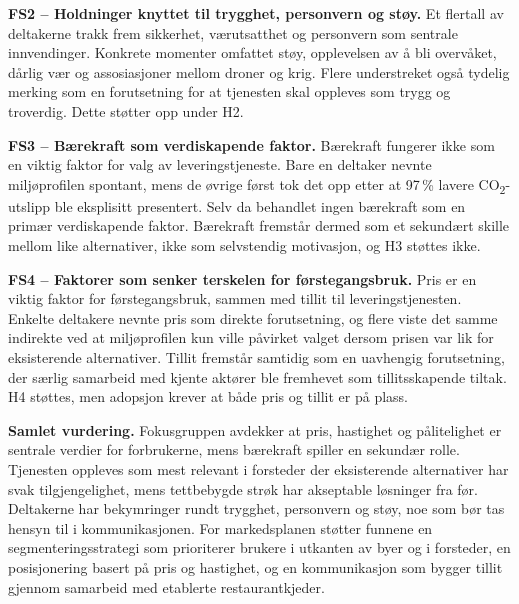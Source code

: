 \textbf{FS2 -- Holdninger knyttet til trygghet, personvern og støy.}
Et flertall av deltakerne trakk frem sikkerhet, værutsatthet og personvern
som sentrale innvendinger. Konkrete momenter omfattet støy, opplevelsen av å
bli overvåket, dårlig vær og assosiasjoner mellom droner og krig. Flere understreket også tydelig merking
som en forutsetning for at tjenesten skal oppleves som trygg og troverdig.
Dette støtter opp under H2.

\textbf{FS3 -- Bærekraft som verdiskapende faktor.}
Bærekraft fungerer ikke som en viktig faktor for valg av leveringstjeneste.
Bare en deltaker nevnte miljøprofilen spontant, mens de øvrige først tok
det opp etter at 97\,\% lavere CO\textsubscript{2}-utslipp ble eksplisitt
presentert. Selv da behandlet ingen bærekraft som en primær verdiskapende faktor. Bærekraft fremstår
dermed som et sekundært skille mellom like alternativer, ikke som
selvstendig motivasjon, og H3 støttes ikke.

\textbf{FS4 -- Faktorer som senker terskelen for førstegangsbruk.}
Pris er en viktig faktor for førstegangsbruk, sammen med tillit til leveringstjenesten.
Enkelte deltakere nevnte pris som direkte
forutsetning, og flere viste det samme indirekte ved at miljøprofilen kun
ville påvirket valget dersom prisen var lik for eksisterende alternativer.
Tillit fremstår samtidig som en uavhengig forutsetning, der særlig
samarbeid med kjente aktører ble fremhevet som tillitsskapende tiltak. H4
støttes, men adopsjon krever at både pris og tillit er på plass.

\textbf{Samlet vurdering.}
Fokusgruppen avdekker at pris, hastighet og pålitelighet er sentrale
verdier for forbrukerne, mens bærekraft spiller en sekundær rolle.
Tjenesten oppleves som mest relevant i forsteder der eksisterende
alternativer har svak tilgjengelighet, mens tettbebygde strøk har
akseptable løsninger fra før. Deltakerne har bekymringer rundt trygghet, personvern og
støy, noe som bør tas hensyn til i kommunikasjonen. For markedsplanen støtter funnene
en segmenteringsstrategi som prioriterer brukere i utkanten av byer og i forsteder,
en posisjonering basert på pris og hastighet, og en kommunikasjon som
bygger tillit gjennom samarbeid med etablerte restaurantkjeder.
